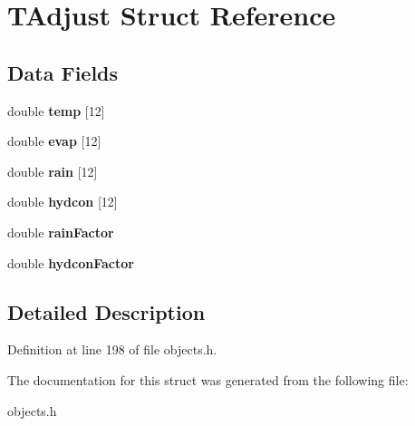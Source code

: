 \hypertarget{struct_t_adjust}{}\section{T\+Adjust Struct Reference}
\label{struct_t_adjust}
\subsection*{Data Fields}
\begin{DoxyCompactItemize}
\item 
\mbox{\label{struct_t_adjust_ad1ac44e3c917b21d053d89c96d2f886c}} 
double {\bfseries temp} \mbox{[}12\mbox{]}
\item 
\mbox{\label{struct_t_adjust_a386d2521eaf45fde9bb53a30b2b0d529}} 
double {\bfseries evap} \mbox{[}12\mbox{]}
\item 
\mbox{\label{struct_t_adjust_aaf2100d9df50b7005414c1b2f51801fa}} 
double {\bfseries rain} \mbox{[}12\mbox{]}
\item 
\mbox{\label{struct_t_adjust_adc3d798192d80d8b2959d2edce52d0fd}} 
double {\bfseries hydcon} \mbox{[}12\mbox{]}
\item 
\mbox{\label{struct_t_adjust_acc99818e67773ba2747286f4038739b7}} 
double {\bfseries rain\+Factor}
\item 
\mbox{\label{struct_t_adjust_a3772d5d6c2633d33d2417e53beba8c0e}} 
double {\bfseries hydcon\+Factor}
\end{DoxyCompactItemize}


\subsection{Detailed Description}


Definition at line 198 of file objects.\+h.



The documentation for this struct was generated from the following file\+:\begin{DoxyCompactItemize}
\item 
objects.\+h\end{DoxyCompactItemize}
